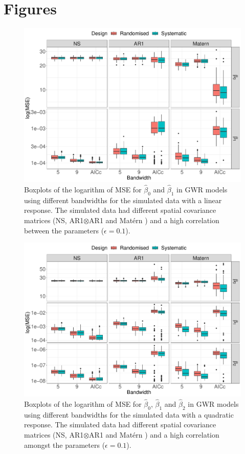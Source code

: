 \documentclass[a4paper]{article} 	%
\newcommand{\Matern}{Mat\'ern }
\begin{document}
\appendix

\section{Figures}

\begin{figure}[H]
	\centering
	\includegraphics[width=\linewidth]{Col_LinCombMSE_newpar_eta01.pdf}
	\caption{Boxplots of the logarithm of MSE for $\hat{\beta}_0$ and $\hat{\beta}_1$ in GWR models using different bandwidths for the simulated data with a linear response. The simulated data had different spatial covariance matrices (NS, AR1$\otimes$AR1 and \Matern) and a high correlation between the parameters ($\epsilon=0.1$).}\label{fig:LinBetaMSEeta01}
\end{figure}


\begin{figure}[H]
	\centering
	\includegraphics[width=\linewidth]{Col_QuaCombMSE_newpar_eta01.pdf}
	\caption{Boxplots of the logarithm of MSE for $\hat{\beta}_0$, $\hat{\beta}_1$ and $\hat{\beta}_2$ in GWR models using different bandwidths for the simulated data with a quadratic response. The simulated data had different spatial covariance matrices (NS, AR1$\otimes$AR1 and \Matern) and a high correlation amongst the parameters ($\epsilon=0.1$).} \label{fig:QuadBetaMSEeta01}
\end{figure}





\renewcommand\bibname{References}%
\printbibliography
\end{document}
